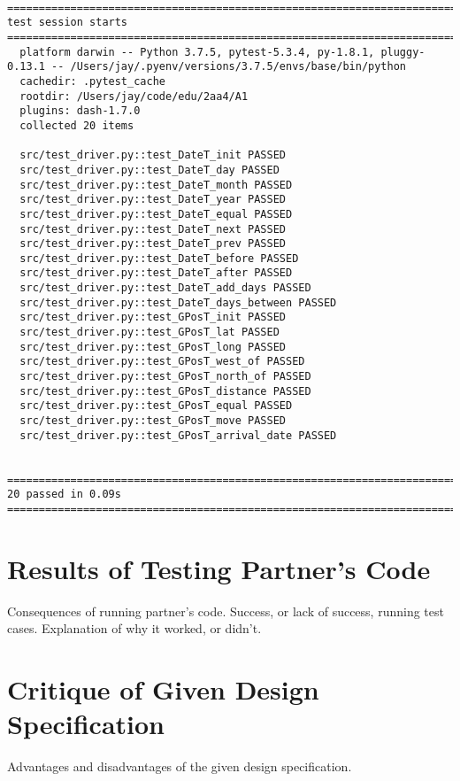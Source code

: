 \documentclass[12pt]{article}
\begin{document}
\begin{lstlisting}
  =========================================================================================== test session starts ============================================================================================
  platform darwin -- Python 3.7.5, pytest-5.3.4, py-1.8.1, pluggy-0.13.1 -- /Users/jay/.pyenv/versions/3.7.5/envs/base/bin/python
  cachedir: .pytest_cache
  rootdir: /Users/jay/code/edu/2aa4/A1
  plugins: dash-1.7.0
  collected 20 items
  
  src/test_driver.py::test_DateT_init PASSED
  src/test_driver.py::test_DateT_day PASSED
  src/test_driver.py::test_DateT_month PASSED
  src/test_driver.py::test_DateT_year PASSED
  src/test_driver.py::test_DateT_equal PASSED
  src/test_driver.py::test_DateT_next PASSED
  src/test_driver.py::test_DateT_prev PASSED
  src/test_driver.py::test_DateT_before PASSED
  src/test_driver.py::test_DateT_after PASSED
  src/test_driver.py::test_DateT_add_days PASSED
  src/test_driver.py::test_DateT_days_between PASSED
  src/test_driver.py::test_GPosT_init PASSED
  src/test_driver.py::test_GPosT_lat PASSED
  src/test_driver.py::test_GPosT_long PASSED
  src/test_driver.py::test_GPosT_west_of PASSED
  src/test_driver.py::test_GPosT_north_of PASSED
  src/test_driver.py::test_GPosT_distance PASSED
  src/test_driver.py::test_GPosT_equal PASSED
  src/test_driver.py::test_GPosT_move PASSED
  src/test_driver.py::test_GPosT_arrival_date PASSED
  
  ============================================================================================ 20 passed in 0.09s ============================================================================================
\end{lstlisting}

\section{Results of Testing Partner's Code}

Consequences of running partner's code.  Success, or lack of success, running
test cases.  Explanation of why it worked, or didn't.

\section{Critique of Given Design Specification}

Advantages and disadvantages of the given design specification.
\end{document}
